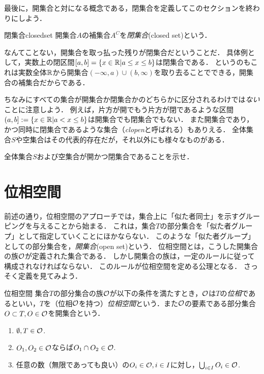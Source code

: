 \documentclass[11pt,a4paper, dvipdfmx]{jsarticle}
\begin{document}

最後に，開集合と対になる概念である，閉集合を定義してこのセクションを終わりにしよう．
\begin{dfn}{閉集合}{closedset}
  開集合$A$の補集合$A^C$を\emph{閉集合}(closed set)という．
\end{dfn}
なんてことない，開集合を取っ払った残りが閉集合だということだ．
具体例として，実数上の閉区間$[a, b] = \{x \in \mathbb{R}| a \leq  x \leq  b\}$は閉集合である．
というのもこれは実数全体$\mathbb{R}$から開集合$(-\infty, a) \cup (b, \infty)$を取り去ることでできる，開集合の補集合だからである．

ちなみにすべての集合が開集合か閉集合かのどちらかに区分されるわけでは\emph{ない}ことに注意しよう．
例えば，片方が開でもう片方が閉であるような区間$(a, b] := \{ x \in \mathbb{R}| a < x \leq b \}$は開集合でも閉集合でもない．
また開集合であり，かつ同時に閉集合であるような集合（\emph{clopen}と呼ばれる）もありえる．
全体集合$S$や空集合はその代表的存在だが，それ以外にも様々なものがある．

\begin{renshu}{}{}
  全体集合$S$および空集合が開かつ閉集合であることを示せ．
\end{renshu}


\section{位相空間}

前述の通り，位相空間のアプローチでは，集合上に「似た者同士」を示すグルーピングを与えることから始まる．
これは，集合$T$の部分集合を「似た者グループ」として指定していくことにほかならない．
このような「似た者グループ」としての部分集合を，\emph{開集合}(open set)という．
位相空間とは，こうした開集合の族$\mathcal{O}$が定義された集合である．
しかし開集合の族は，一定のルールに従って構成されなければならない．
このルールが位相空間を定める公理となる．
さっそく定義を見てみよう．

\begin{dfn}{位相空間}
集合$T$の部分集合の族$\mathcal{O}$が以下の条件を満たすとき，$\mathcal{O}$は$T$の\emph{位相}であるといい，$T$を（位相$\mathcal{O}$を持つ）\emph{位相空間}という．また$\mathcal{O}$の要素である部分集合$O \subset T, O \in \mathcal{O}$を開集合という．
\begin{enumerate}
 \item $\emptyset, T \in \mathcal{O}$.
 \item $O_1, O_2 \in \mathcal{O}$ならば$O_1 \cap O_2 \in \mathcal{O}$.
 \item 任意の数（無限であっても良い）の$O_i \in \mathcal{O}, i \in I$に対し，$\bigcup_{i \in I} O_i \in \mathcal{O}$.
\end{enumerate}
\end{dfn}
\end{document}
